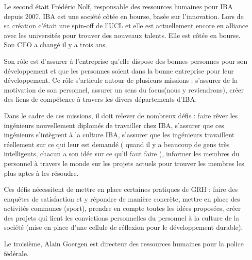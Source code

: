 \documentclass[a4paper, 12pt]{article}
\begin{document}
Le second était Frédéric Nolf, responsable des ressources humaines pour IBA depuis 2007. IBA est une société côtée en bourse, basée sur l'innovation. Lors de sa création c'était une spin-off de l'UCL et elle est actuellement encore en alliance avec les universités pour trouver des nouveaux talents. Elle est côtée en bourse. Son CEO a changé il y a trois ans.

Son rôle est d'assurer à l'entreprise qu'elle dispose des bonnes personnes pour son développement et que les personnes soient dans la bonne entreprise pour leur développement. Ce rôle s'articule autour de plusieurs missions : s'assurer de la motivation de son personnel, assurer un \og{} sens du focus\fg{}(nous y reviendrons), créer des liens de compétence à travers les divers départements d'IBA.


Dans le cadre de ces missions, il doit relever de nombreux défis : faire rêver les ingénieurs nouvellement diplomés de travailler chez IBA, s'assurer que ces ingénieurs s'intègrent à la culture IBA, s'assurer que les ingénieurs travaillent réellement sur ce qui leur est demandé (\og{} quand il y a beaucoup de gens très intelligents, chacun a son idée sur ce qu'il faut faire \fg{}), informer les membres du personnel à travers le monde sur les projets actuels pour trouver les membres les plus aptes à les résoudre.

Ces défis nécessitent de mettre en place certaines pratiques de GRH : faire des enquêtes de satisfaction et y répondre de manière concrète, mettre en place des activités communes (sport), prendre en compte toutes les idées proposées, créer des projets qui lient les convictions personnelles du personnel à la culture de la société (mise en place d'une cellule de réflexion pour le développement durable).

Le troisième, Alain Goergen est directeur des ressources humaines pour la police fédérale.











\end{document}
